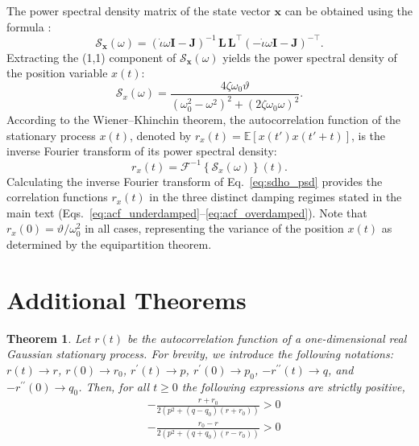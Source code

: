 \documentclass[journal]{IEEEtran}
\theoremstyle{plain}
\newtheorem{theorem}{Theorem}[section]
\theoremstyle{definition}
\theoremstyle{remark}
\newcommand{\E}{\mathbb{E}}
\newcommand{\temp}{\vartheta}
\newcommand{\rp}{r^\prime}
\newcommand{\rpp}{r^{\prime\prime}}
\begin{document}
The power spectral density matrix of the state vector \(\mathbf{x}\) can be obtained using the formula \cite{rawat2024element}:
\begin{equation}
    \boldsymbol{\mathcal{S}}_\mathbf{x}(\omega) = (\dot{\iota}\omega \mathbf{I} - \mathbf{J})^{-1} \, \mathbf{L} \, \mathbf{L}^\top (-\dot{\iota}\omega \mathbf{I} - \mathbf{J})^{-\top}.
\label{eq:psd_general_formula_sdho}
\end{equation}
Extracting the (1,1) component of \(\boldsymbol{\mathcal{S}}_\mathbf{x}(\omega)\) yields the power spectral density of the position variable \(x(t)\):
\begin{equation}
    \mathcal{S}_x(\omega) = \frac{4 \zeta \omega_0 \temp}{(\omega_0^2 - \omega^2)^2 + (2 \zeta \omega_0 \omega)^2}.
\label{eq:sdho_psd}
\end{equation}
According to the Wiener--Khinchin theorem, the autocorrelation function of the stationary process \(x(t)\), denoted by \(r_x(t) = \E[x(t')x(t'+t)]\), is the inverse Fourier transform of its power spectral density:
\begin{equation}
    r_x(t) = \mathcal{F}^{-1}\left\{\mathcal{S}_x(\omega)\right\}(t).
\label{eq:acf_ift_sdho}
\end{equation}
Calculating the inverse Fourier transform of Eq.~\eqref{eq:sdho_psd} provides the correlation functions $r_x(t)$ in the three distinct damping regimes stated in the main text (Eqs.~\eqref{eq:acf_underdamped}--\eqref{eq:acf_overdamped}). Note that $r_x(0) = \temp/\omega_0^2$ in all cases, representing the variance of the position $x(t)$ as determined by the equipartition theorem.


\section{Additional Theorems}

\begin{theorem} \label{thrm:positivity_of_correlation_term}
Let $r(t)$ be the autocorrelation function of a one-dimensional real Gaussian stationary process. For brevity, we introduce the following notations: $r(t)\rightarrow r$, $r(0)\rightarrow r_0$, $\rp(t) \rightarrow p$, $\rp(0)\rightarrow p_0$, $-\rpp(t) \rightarrow q$, and $-\rpp(0)\rightarrow q_0$. Then, for all $t \geq 0$ the following expressions are strictly positive,
\begin{equation}
\begin{split}
 &-\frac{r+r_0}{2\left(p^2+(q-q_0)(r+r_0)\right)} > 0 \\
 &-\frac{r_0-r}{2\left(p^2+(q+q_0)(r-r_0)\right)} > 0
\end{split}
\end{equation}
\end{theorem}
\end{document}
